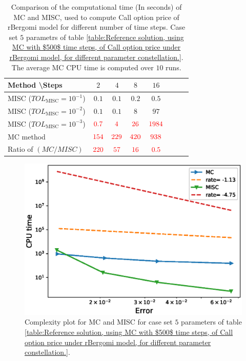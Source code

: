 \FloatBarrier
\begin{table}[h!]
	\centering
	\begin{tabular}{l*{6}{c}r}
		Method \textbackslash  Steps            & $2$ & $4$ & $8$ & $16$ &   \\
		\hline
		MISC ($TOL_{\text{MISC}}=10^{-1}$)  & $0.1$ & $0.1$ & $0.2$ & $0.5$ \\
		MISC ($TOL_{\text{MISC}}=10^{-2}$)  & $0.1$ & $0.1$ & $8$ & $97$ \\
		MISC ($TOL_{\text{MISC}}=10^{-3}$)  & $\red{0.7}$ & $\red{4}$ & $\red{26}$ & $\red{1984}$ \\
		\hline
		MC method   & $ \red{154}
		
		$  & $  \red{229}$  & $  \red{420}$ & $ \red{938}
		$  \\	
		\hline
		Ratio of $\left(MC/MISC \right)$ & $ \red{   220}
		
		$  & $  \red{
		 57
		}$  & $  \red{    16
		}$ & $ \red{ 0.5}
		$  \\	
				
		\hline
	\end{tabular}
	\caption{Comparison of the computational time (In seconds) of  MC and MISC, used to compute Call option price of rBergomi model for different number of time steps. Case set $5$ parametrs of table \ref{table:Reference solution, using MC with $500$ time steps, of Call option price under rBergomi model, for different parameter constellation.}. The average  MC CPU time is computed over $10$ runs. }
	\label{Comparsion of the computational time of  MC and MISC, used to compute Call option price of rBergomi model for different number of time steps. Case set5}
\end{table}

\FloatBarrier


	\begin{figure}[h!]
	\centering
	\includegraphics[width=0.4\linewidth]{./figures/rBergomi_Complexity_rates/set7/error_vs_time_set7}
	
	\caption{Complexity plot for   MC and MISC for case set $5$ parameters of table \ref{table:Reference solution, using MC with $500$ time steps, of Call option price under rBergomi model, for different parameter constellation.}.}
	\label{fig:Complexity plot for MC and MISC for Case set $5$ parameters}
\end{figure}
\FloatBarrier



